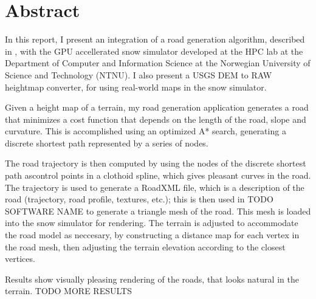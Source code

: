 \chapter*{Abstract}

In this report, I present an integration of a road generation algorithm, described in \cite{roadgen}, with the GPU accellerated snow simulator developed at the HPC lab at the Department of Computer and Information Science at the Norwegian University of Science and Technology (NTNU). I also present a USGS DEM to RAW heightmap converter, for using real-world maps in the snow simulator. 

Given a height map of a terrain, my road generation application generates a road that minimizes a cost function that depends on the length of the road, slope and curvature. This is accomplished using an optimized A* search, generating a discrete shortest path represented by a series of nodes. 

The road trajectory is then computed by using the nodes of the discrete shortest path ascontrol points in a clothoid spline, which gives pleasant curves in the road. The trajectory is used to generate a RoadXML file, which is a description of the road (trajectory, road profile, textures, etc.); this is then used in TODO SOFTWARE NAME to generate a triangle mesh of the road. This mesh is loaded into the snow simulator for rendering. The terrain is adjusted to accommodate the road model as neccesary, by constructing a distance map for each vertex in the road mesh, then adjusting the terrain elevation according to the closest vertices.

Results show visually pleasing rendering of the roads, that looks natural in the terrain. TODO MORE RESULTS

